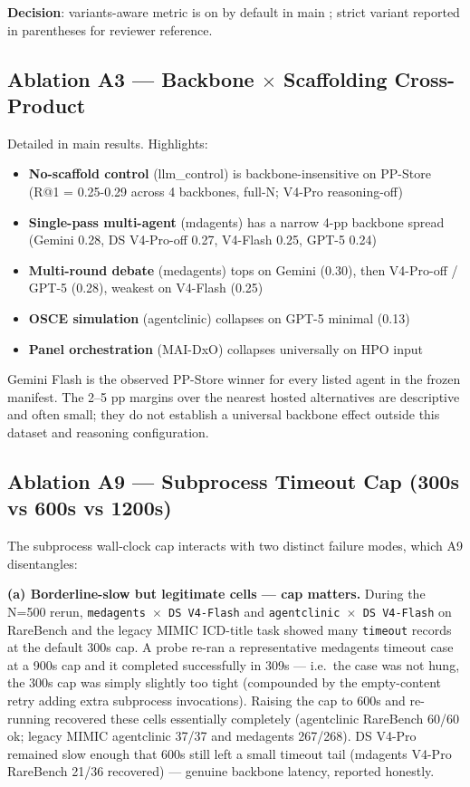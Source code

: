 \textbf{Decision}: variants-aware metric is on by default in main ;
strict variant reported in parentheses for reviewer reference.

\subsection{Ablation A3 --- Backbone \ensuremath{\times} Scaffolding Cross-Product}\label{sec-8-2}

Detailed in  main results. Highlights:

\begin{itemize}
\tightlist
\item
  \textbf{No-scaffold control} (llm\_control) is backbone-insensitive on
  PP-Store (R@1 = 0.25-0.29 across 4 backbones, full-N; V4-Pro reasoning-off)
\item
  \textbf{Single-pass multi-agent} (mdagents) has a narrow 4-pp backbone spread
  (Gemini 0.28, DS V4-Pro-off 0.27, V4-Flash 0.25, GPT-5 0.24)
\item
  \textbf{Multi-round debate} (medagents) tops on Gemini (0.30), then V4-Pro-off /
  GPT-5 (0.28), weakest on V4-Flash (0.25)
\item
  \textbf{OSCE simulation} (agentclinic) collapses on GPT-5 minimal (0.13)
\item
  \textbf{Panel orchestration} (MAI-DxO) collapses universally on HPO input
\end{itemize}

Gemini Flash is the observed PP-Store winner for every listed agent in the
frozen manifest. The 2--5 pp margins over the nearest hosted alternatives are
descriptive and often small; they do not establish a universal backbone effect
outside this dataset and reasoning configuration.

\subsection{Ablation A9 --- Subprocess Timeout Cap (300s vs 600s vs 1200s)}\label{sec-8-6}

The subprocess wall-clock cap interacts with two distinct failure modes,
which A9 disentangles:

\textbf{(a) Borderline-slow but legitimate cells --- cap matters.} During the
N=500 rerun, \texttt{medagents\ \ensuremath{\times}\ DS\ V4-Flash} and \texttt{agentclinic\ \ensuremath{\times}\ DS\ V4-Flash}
on RareBench and the legacy MIMIC ICD-title task showed many \texttt{timeout} records at the default 300s
cap. A probe re-ran a representative medagents timeout case at a 900s
cap and it completed successfully in 309s --- i.e.~the case was not
hung, the 300s cap was simply slightly too tight (compounded by the
empty-content retry adding extra subprocess invocations). Raising the cap to 600s and
re-running recovered these cells essentially completely (agentclinic
RareBench 60/60 ok; legacy MIMIC agentclinic 37/37 and medagents 267/268). DS
V4-Pro remained slow enough that 600s still left a small timeout tail
(mdagents V4-Pro RareBench 21/36 recovered) --- genuine backbone latency,
reported honestly.

